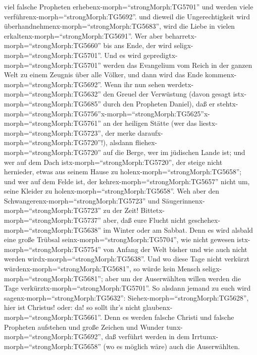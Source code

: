 viel falsche Propheten erhebenx-morph=``strongMorph:TG5701'' und werden
viele verführenx-morph=``strongMorph:TG5692''.  und dieweil
die Ungerechtigkeit wird überhandnehmenx-morph=``strongMorph:TG5683'',
wird die Liebe in vielen erkaltenx-morph=``strongMorph:TG5691''.
 Wer aber beharretx-morph=``strongMorph:TG5660'' bis ans
Ende, der wird seligx-morph=``strongMorph:TG5701''.  Und es
wird gepredigtx-morph=``strongMorph:TG5701'' werden das Evangelium vom
Reich in der ganzen Welt zu einem Zeugnis über alle Völker, und dann
wird das Ende kommenx-morph=``strongMorph:TG5692''.  Wenn
ihr nun sehen werdetx-morph=``strongMorph:TG5632'' den Greuel der
Verwüstung (davon gesagt istx-morph=``strongMorph:TG5685'' durch den
Propheten Daniel), daß er
stehtx-morph=``strongMorph:TG5756''\textbar x-morph=``strongMorph:TG5625''x-morph=``strongMorph:TG5761''
an der heiligen Stätte (wer das liestx-morph=``strongMorph:TG5723'', der
merke daraufx-morph=``strongMorph:TG5720''!),  alsdann
fliehex-morph=``strongMorph:TG5720'' auf die Berge, wer im jüdischen
Lande ist;  und wer auf dem Dach
istx-morph=``strongMorph:TG5720'', der steige nicht hernieder, etwas aus
seinem Hause zu holenx-morph=``strongMorph:TG5658'';  und
wer auf dem Felde ist, der kehrex-morph=``strongMorph:TG5657'' nicht um,
seine Kleider zu holenx-morph=``strongMorph:TG5658''.  Weh
aber den Schwangerenx-morph=``strongMorph:TG5723'' und
Säugerinnenx-morph=``strongMorph:TG5723'' zu der Zeit! 
Bittetx-morph=``strongMorph:TG5737'' aber, daß eure Flucht nicht
geschehex-morph=``strongMorph:TG5638'' im Winter oder am Sabbat.
 Denn es wird alsbald eine große Trübsal
seinx-morph=``strongMorph:TG5704'', wie nicht gewesen
istx-morph=``strongMorph:TG5754'' von Anfang der Welt bisher und wie
auch nicht werden wirdx-morph=``strongMorph:TG5638''.  Und
wo diese Tage nicht verkürzt würdenx-morph=``strongMorph:TG5681'', so
würde kein Mensch seligx-morph=``strongMorph:TG5681''; aber um der
Auserwählten willen werden die Tage
verkürztx-morph=``strongMorph:TG5701''.  So alsdann jemand
zu euch wird sagenx-morph=``strongMorph:TG5632'':
Siehex-morph=``strongMorph:TG5628'', hier ist Christus! oder: da! so
sollt ihr's nicht glaubenx-morph=``strongMorph:TG5661''. 
Denn es werden falsche Christi und falsche Propheten aufstehen und große
Zeichen und Wunder tunx-morph=``strongMorph:TG5692'', daß verführt
werden in dem Irrtumx-morph=``strongMorph:TG5658'' (wo es möglich wäre)
auch die Auserwählten. 

